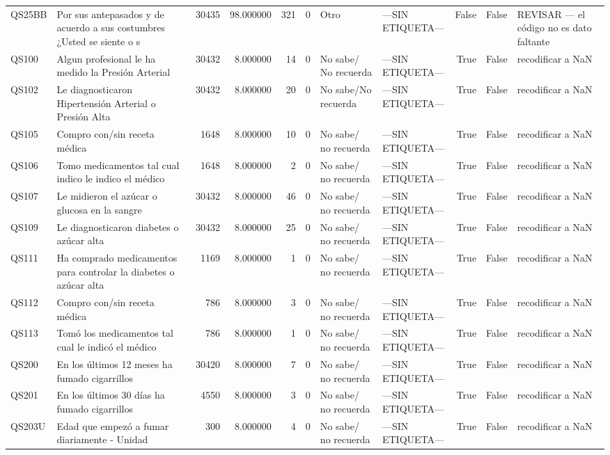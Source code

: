 \begin{longtable}{llrrrrllrrl}
QS25BB & Por sus antepasados y de acuerdo a sus costumbres ¿Usted se siente o s & 30435 & 98.000000 & 321 & 0 & Otro & —SIN ETIQUETA— & False & False & REVISAR — el código no es dato faltante \\
QS100 & Algun profesional le ha medido la Presión Arterial & 30432 & 8.000000 & 14 & 0 & No sabe/ No recuerda & —SIN ETIQUETA— & True & False & recodificar a NaN \\
QS102 & Le diagnosticaron Hipertensión Arterial o Presión Alta & 30432 & 8.000000 & 20 & 0 & No sabe/No recuerda & —SIN ETIQUETA— & True & False & recodificar a NaN \\
QS105 & Compro con/sin receta médica & 1648 & 8.000000 & 10 & 0 & No sabe/ no recuerda & —SIN ETIQUETA— & True & False & recodificar a NaN \\
QS106 & Tomo medicamentos tal cual indico le indico el médico & 1648 & 8.000000 & 2 & 0 & No sabe/ no recuerda & —SIN ETIQUETA— & True & False & recodificar a NaN \\
QS107 & Le midieron el azúcar o glucosa en la sangre & 30432 & 8.000000 & 46 & 0 & No sabe/ no recuerda & —SIN ETIQUETA— & True & False & recodificar a NaN \\
QS109 & Le diagnosticaron diabetes o azúcar alta & 30432 & 8.000000 & 25 & 0 & No sabe/ no recuerda & —SIN ETIQUETA— & True & False & recodificar a NaN \\
QS111 & Ha comprado medicamentos para controlar la diabetes o azúcar alta & 1169 & 8.000000 & 1 & 0 & No sabe/ no recuerda & —SIN ETIQUETA— & True & False & recodificar a NaN \\
QS112 & Compro con/sin receta médica & 786 & 8.000000 & 3 & 0 & No sabe/ no recuerda & —SIN ETIQUETA— & True & False & recodificar a NaN \\
QS113 & Tomó los medicamentos tal cual le indicó el médico & 786 & 8.000000 & 1 & 0 & No sabe/ no recuerda & —SIN ETIQUETA— & True & False & recodificar a NaN \\
QS200 & En los  últimos 12 meses ha fumado cigarrillos & 30420 & 8.000000 & 7 & 0 & No sabe/ no recuerda & —SIN ETIQUETA— & True & False & recodificar a NaN \\
QS201 & En los últimos 30 días ha fumado cigarrillos & 4550 & 8.000000 & 3 & 0 & No sabe/ no recuerda & —SIN ETIQUETA— & True & False & recodificar a NaN \\
QS203U & Edad que empezó a fumar diariamente - Unidad & 300 & 8.000000 & 4 & 0 & No sabe/ no recuerda & —SIN ETIQUETA— & True & False & recodificar a NaN \\

\end{longtable}
